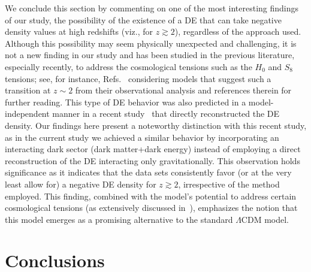 \documentclass[twocolumn,a4paper,reprint,amssymb,aps,prd,groupedaddress,superscriptaddress,nofootinbib]{revtex4-2}
\begin{document}
{We conclude this section by commenting on one of the most interesting findings of our study, the possibility of the existence of a DE that can take negative density values at high redshifts (viz., for $z\gtrsim2$), regardless of the approach used. Although this possibility may seem physically unexpected and challenging, it is not a new finding in our study and has been studied in the previous literature, especially recently, to address the cosmological tensions such as the $H_0$ and $S_8$ tensions; see, for instance, Refs.~\cite{Akarsu:2019hmw, Akarsu:2021fol,Akarsu:2022typ,Akarsu:2023mfb,Adil:2023exv} considering models that suggest such a transition at $z\sim2$ from their observational analysis and references therein for further reading. This type of DE behavior was also predicted in a model-independent manner in a recent study~\cite{Escamilla:2021uoj} that directly reconstructed the DE density. Our findings here present a noteworthy distinction with this recent study, as in the current study we achieved a similar behavior by incorporating an interacting dark sector (dark matter+dark energy) instead of employing a direct reconstruction of the DE interacting only gravitationally. This observation holds significance as it indicates that the data sets consistently favor (or at the very least allow for) a negative DE density for $z\gtrsim2$, irrespective of the method employed. This finding, combined with the model's potential to address certain cosmological tensions (as extensively discussed in~\cite{Akarsu:2022typ, Akarsu:2023mfb}), emphasizes the notion that this model emerges as a promising alternative to the standard $\Lambda$CDM model.}

\section{Conclusions}\label{section:conclusions}
\end{document}
